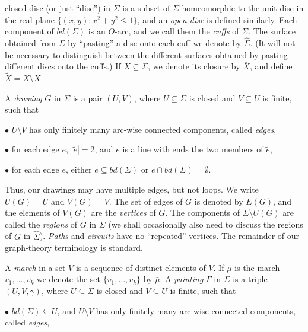 \noindent closed disc (or just ``disc'') in $\Sigma$ is a subset of $\Sigma$ homeomorphic to the unit disc in the real plane $\{(x, y) : x^2 + y^2 \le 1\}$, and an \textit{open disc} is defined similarly. Each component of $bd(\Sigma)$ is an $O$-arc, and we call them the \textit{cuffs} of $\Sigma$. The surface obtained from $\Sigma$ by ``pasting'' a disc onto each cuff we denote by $\hat{\Sigma}$. (It will not be necessary to distinguish between the different surfaces obtained by pasting different discs onto the cuffs.) If $X \subseteq \Sigma$, we denote its closure by $\bar{X}$, and define $\tilde{X} = \bar{X} \setminus X$.

A \textit{drawing} $G$ in $\Sigma$ is a pair $(U, V)$, where $U \subseteq \Sigma$ is closed and $V \subseteq U$ is finite, such that

\hspace*{12pt}$\bullet$ $U \setminus V$ has only finitely many arc-wise connected components, called \textit{edges},

\hspace*{12pt}$\bullet$ for each edge $e$, $|\tilde{e}| = 2$, and $\bar{e}$ is a line with ends the two members of $\tilde{e}$,

\hspace*{12pt}$\bullet$ for each edge $e$, either $e \subseteq bd(\Sigma)$ or $e \cap bd(\Sigma) = \emptyset$.

Thus, our drawings may have multiple edges, but not loops. We write $U(G) = U$ and $V(G) = V$. The set of edges of $G$ is denoted by $E(G)$, and the elements of $V(G)$ are the \textit{vertices} of $G$. The components of $\Sigma \setminus U(G)$ are called the \textit{regions} of $G$ in $\Sigma$ (we shall occasionally also need to discuss the regions of $G$ in $\hat{\Sigma}$). \textit{Paths} and \textit{circuits} have no ``repeated'' vertices. The remainder of our graph-theory terminology is standard.

A \textit{march} in a set $V$ is a sequence of distinct elements of $V$. If $\mu$ is the march $v_1, \dots, v_k$ we denote the set $\{v_1, \dots, v_k\}$ by $\bar{\mu}$. A \textit{painting} $\Gamma$ in $\Sigma$ is a triple $(U, V, \gamma)$, where $U \subseteq \Sigma$ is closed and $V \subseteq U$ is finite, such that

\hspace*{12pt}$\bullet$ $bd(\Sigma) \subseteq U$, and $U \setminus V$ has only finitely many arc-wise connected components, called \textit{edges},

